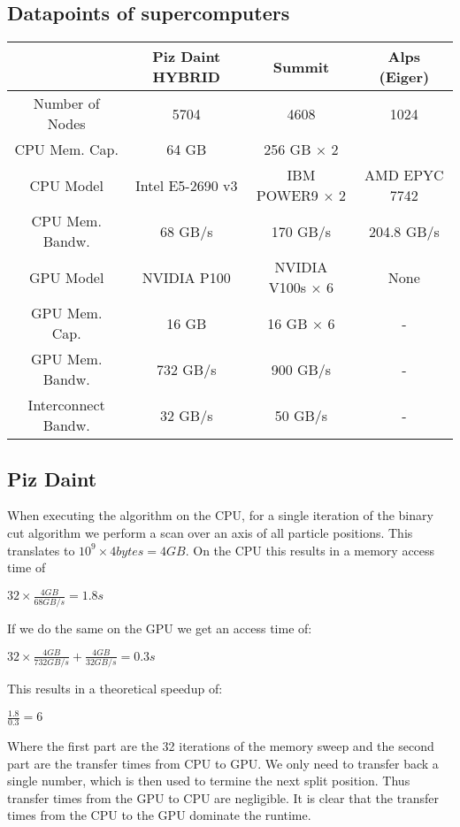 \documentclass[]{article}
\begin{document}
\subsection{Datapoints of supercomputers}

\small
\begin{center}
	\begin{tabular}{ c c c c }
		& Piz Daint HYBRID \cite{piz_daint} & Summit & Alps (Eiger) \\ 
		\hline
		Number of Nodes & 5704 & 4608 & 1024\\
		CPU Mem. Cap. & 64 GB & 256 GB $\times$ 2  \\   
		CPU Model & Intel E5-2690 v3 & IBM POWER9 $\times$ 2 & AMD EPYC 7742 \\
		CPU Mem. Bandw.  & 68 GB/s & 170 GB/s & 204.8 GB/s\\
		GPU Model & NVIDIA P100 & NVIDIA V100s  $\times$ 6 & None \\
		GPU Mem. Cap. & 16 GB & 16 GB $\times$ 6 & -\\
		GPU Mem. Bandw. & 732 GB/s & 900 GB/s & -\\
		Interconnect Bandw. & 32 GB/s & 50 GB/s & -\\
	\end{tabular}
\end{center}
\normalfont
\subsection{Piz Daint} 
When executing the algorithm on the CPU, for a single iteration of the binary cut algorithm we perform a scan over an axis of all particle positions. This translates to $10^9 \times 4 bytes = 4 GB$.
On the CPU this results in a memory access time of 
\begin{center}
	$32 \times \frac{ 4 GB}{68 GB/s} = 1.8 s$ 
\end{center}

If we do the same on the GPU we get an access time of:
\begin{center}
	$32 \times \frac{4 GB}{732 GB/s} + \frac{4 GB}{32 GB/s} = 0.3 s$ 
\end{center}

This results in a theoretical speedup of:

\begin{center}
	$\frac{1.8}{0.3} = 6$
\end{center}

Where the first part are the 32 iterations of the memory sweep and the second part are the transfer times from CPU to GPU. We only need to transfer back a single number, which is then used to termine the next split position. Thus transfer times from the GPU to CPU are negligible. It is clear that the transfer times from the CPU to the GPU dominate the runtime.
\end{document}
